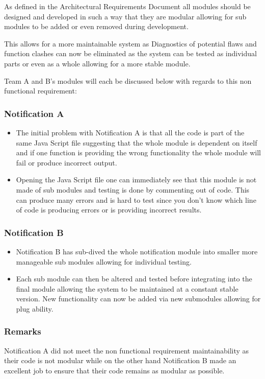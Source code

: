 As defined in the Architectural Requirements Document all modules should be designed and developed in such a way that they are modular allowing for sub modules to be added or even removed during development.\newline

This allows for a more maintainable system as Diagnostics of potential flaws and function clashes can now be eliminated as the system can be tested as individual parts or even as a whole allowing for a more stable module.\newline

Team A and B's modules will each be discussed below with regards to this non functional requirement:
\subsubsection*{Notification A}
\begin{itemize}
	\item The initial problem with Notification A is that all the code is part of the same Java Script file suggesting that the whole module is dependent on itself and if one function is providing the wrong functionality the whole module will fail or produce incorrect output.
	\item Opening the Java Script file one can immediately see that this module is not made of sub modules and testing is done by commenting out of code. This can produce many errors and is hard to test since you don't know which line of code is producing errors or is providing incorrect results.  
\end{itemize}

\subsubsection*{Notification B}
\begin{itemize}
	\item Notification B has sub-dived the whole notification module into smaller more manageable sub modules allowing for individual testing. 
	\item Each sub module can then be altered and tested before integrating into the final module allowing the system to be maintained at a constant stable version. New functionality can now be added via new submodules allowing for plug ability. 
\end{itemize}

\subsubsection*{Remarks}
Notification A did not meet the non functional requirement maintainability as their code is not modular while on the other hand Notification B made an excellent job to ensure that their code remains as modular as possible.
